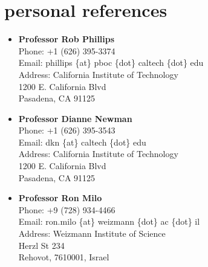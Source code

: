 \documentclass[]{friggeri-cv}
\begin{document}
\newpage 
\section{personal references}
\begin{itemize}
	\item \textbf{Professor Rob Phillips}\\
	Phone:  +1 (626) 395-3374\\
	Email:  phillips \{at\} pboc \{dot\} caltech \{dot\} edu\\
	Address:  California Institute of Technology\\
	1200 E. California Blvd\\
	Pasadena, CA 91125
	
	\item \textbf{Professor Dianne Newman}\\
	Phone:  +1 (626)  395-3543\\
	Email:  dkn \{at\} caltech \{dot\} edu\\
	Address:  California Institute of Technology\\
	1200 E. California Blvd\\
	Pasadena, CA 91125
	
	\item \textbf{Professor Ron Milo}\\
	Phone: +9 (728) 934-4466\\
	Email:  ron.milo \{at\} weizmann \{dot\} ac \{dot\} il\\
	Address:  Weizmann Institute of Science\\
	Herzl St 234\\
	Rehovot, 7610001, Israel
\end{itemize}
\end{document}
